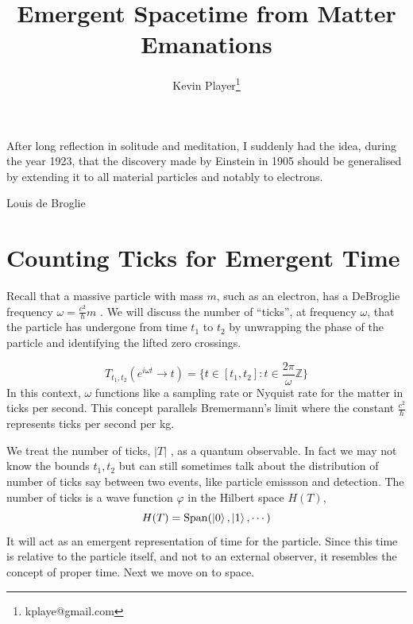 \documentclass[12pt,a4paper]{article}
\begin{document}
\title{Emergent Spacetime from Matter Emanations}
\author[1]{Kevin Player\footnote{kplaye@gmail.com}}

\maketitle


\epigraph{After long reflection in solitude and meditation, I suddenly had the idea, during the year 1923, that the discovery made by Einstein in 1905 should be generalised by extending it to all material particles and notably to electrons.}{Louis de Broglie}


 
\section{Counting Ticks for Emergent Time}

Recall that a massive particle with mass $m$, such as an electron, has a DeBroglie frequency $\omega = \frac{c^2}{\hslash} m$ \cite{debroglie}. We will discuss the number of ``ticks'', at frequency $\omega$, that the particle has undergone from time $t_1$ to $t_2$ by unwrapping the phase of the particle and identifying the lifted zero crossings.

\[
    T_{t_1,t_2}(e^{i \omega t} \rightarrow t) = \{ t \in [t_1,t_2]: t \in \frac{2 \pi}{\omega} \mathbb{Z} \}
\]
In this context, $\omega$ functions like a sampling rate or Nyquist rate for the matter in ticks per second.  This concept parallels Bremermann's limit where the constant $\frac{c^2}{\hslash}$ represents ticks per second per kg.  


We treat the number of ticks, $|T|$ , as a quantum observable.  In fact we may not know the bounds $t_1,t_2$ but can still sometimes talk about the distribution of number of ticks say between two events, like particle emissson and detection.  The number of ticks is a wave function $\varphi$ in the Hilbert space $H(T)$,
\[
   H(T) = \mathrm{Span}(\ket{0}, \ket{1}, \cdots)
\]
It will act as an emergent representation of time for the particle. Since this time is relative to the particle itself, and not to an external observer, it resembles the concept of proper time.  Next we move on to space.
\end{document}
